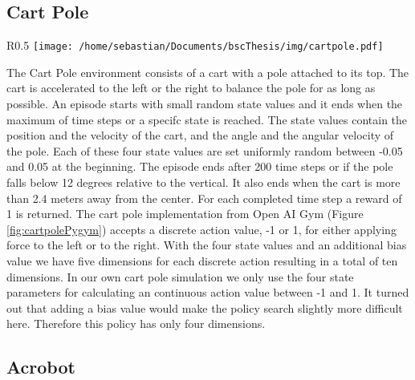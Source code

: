 \subsection{Cart Pole}

\begin{wrapfigure}{R}{0.5\textwidth}
    \centering
    \texttt{[image: /home/sebastian/Documents/bscThesis/img/cartpole.pdf]}
    \caption{Visualization of the Cart Pole rendered by the Open AI Gym\label{fig:cartpolePygym}}
\end{wrapfigure}


The Cart Pole environment consists of a cart with a pole attached to its top. The cart is accelerated to the left or the right to balance the pole for as long as possible. An episode starts with small random state values and it ends when the maximum of time steps or a specifc state is reached. The state values contain the position and the velocity of the cart, and the angle and the angular velocity of the pole. Each of these four state values are set uniformly random between -0.05 and 0.05 at the beginning. The episode ends after 200 time steps or if the pole falls below 12 degrees relative to the vertical. It also ends when the cart is more than 2.4 meters away from the center. For each completed time step a reward of 1 is returned. The cart pole implementation from Open AI Gym (Figure \ref{fig:cartpolePygym}) accepts a discrete action value, -1 or 1, for either applying force to the left or to the right. With the four state values and an additional bias value we have five dimensions for each discrete action resulting in a total of ten dimensions. In our own cart pole simulation we only use the four state parameters for calculating an continuous action value between -1 and 1. It turned out that adding a bias value would make the policy search slightly more difficult here. Therefore this policy has only four dimensions.

\subsection{Acrobot}


